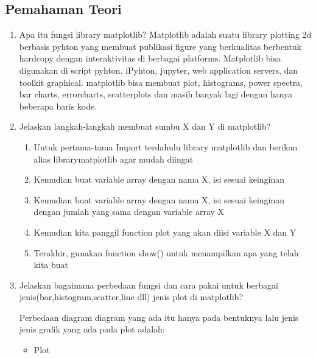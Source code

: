 \subsection{Pemahaman Teori}
\begin{enumerate}
\item Apa itu fungsi library matplotlib?
Matplotlib adalah suatu library plotting 2d berbasis pyhton yang membuat publikasi figure yang berkualitas berbentuk hardcopy dengan interaktivitas di berbagai platforms. Matplotlib bisa digunakan di script pyhton, iPyhton, jupyter, web application servers, dan toolkit graphical. matplotlib bisa membuat plot, histograms, power spectra, bar charts, errorcharts, scatterplots dan masih banyak lagi dengan hanya beberapa baris kode.

\item Jelaskan langkah-langkah membuat sumbu X dan Y di matplotlib?
\begin{enumerate}
	\item Untuk pertama-tama Import terdahulu library matplotlib dan berikan alias librarymatplotlib agar mudah diingat
	
	
	\item Kemudian buat variable array dengan nama X, isi sesuai keinginan
	
	
	\item Kemudian buat variable array dengan nama X, isi sesuai keinginan dengan jumlah yang sama dengan variable array X
	
	
	\item Kemudian kita panggil function plot yang akan diisi variable X dan Y
	
	
	\item Terakhir, gunakan function show() untuk menampilkan apa yang telah kita buat
	
\end{enumerate}

\item Jelaskan bagaimana perbedaan fungsi dan cara pakai untuk berbagai jenis(bar,histogram,scatter,line dll) jenis plot di matplotlib?

	Perbedaan diagram diagram yang ada itu hanya pada bentuknya lalu jenis jenis grafik yang ada pada plot adalah:
\begin{itemize}
	\item Plot
		

\end{itemize}
\end{enumerate}

